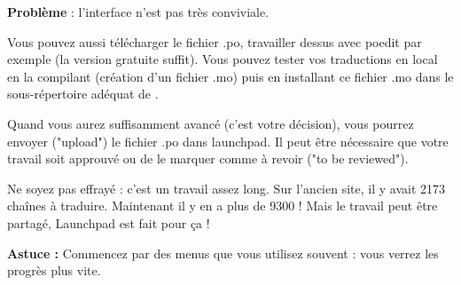\textbf{Problème} : l'interface n'est pas très conviviale.

Vous pouvez aussi télécharger le fichier .po, travailler dessus avec poedit par exemple (la version gratuite suffit). Vous pouvez tester vos traductions en local en la compilant (création d'un fichier .mo) puis en installant ce fichier .mo dans le sous-répertoire adéquat de \codeblocks.

Quand vous aurez suffisamment avancé (c'est votre décision), vous pourrez envoyer ("upload") le fichier .po dans launchpad. Il peut être nécessaire que votre travail soit approuvé ou de le marquer comme à revoir ("to be reviewed").

Ne soyez pas effrayé : c'est un travail assez long. Sur l'ancien site, il y avait 2173 chaînes à traduire. Maintenant il y en a plus de 9300 ! Mais le travail peut être partagé, Launchpad est fait pour ça !

\textbf{Astuce :} Commencez par des menus que vous utilisez souvent : vous verrez les progrès plus vite.

